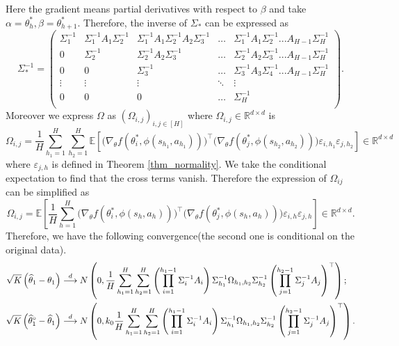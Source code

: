 \documentclass{article}
\numberwithin{equation}{section}
\theoremstyle{plain}
\theoremstyle{definition}
\theoremstyle{remark}
\begin{document}
Here the gradient means partial derivatives with respect to $\beta$ and take $\alpha = \theta_h^*, \beta = \theta_{h+1}^*.$ Therefore, the inverse of $\Sigma_*$ can be expressed as
\begin{equation*}
    \Sigma^{-1}_* = \begin{pmatrix}
    \Sigma^{-1}_1 & \Sigma^{-1}_1 A_1 \Sigma^{-1}_2 & \Sigma^{-1}_1 A_1 \Sigma^{-1}_2 A_2 \Sigma^{-1}_3 & \ldots & \Sigma^{-1}_1 A_1 \Sigma^{-1}_2 ... A_{H-1}\Sigma^{-1}_H \\
    0 & \Sigma^{-1}_2 & \Sigma^{-1}_2 A_2 \Sigma^{-1}_3 & \ldots & \Sigma^{-1}_2 A_2 \Sigma^{-1}_3 ... A_{H-1} \Sigma^{-1}_H \\
    0 & 0 & \Sigma^{-1}_3 & \ldots & \Sigma^{-1}_3 A_3 \Sigma^{-1}_4 ... A_{H-1} \Sigma^{-1}_H \\
    \vdots & \vdots & \vdots & \ddots & \vdots \\
    0 & 0 & 0 & \ldots & \Sigma^{-1}_H \\
    \end{pmatrix}.
\end{equation*}
Moreover we express $\Omega$ as $(\Omega_{i,j})_{i,j \in [H]}$ where $\Omega_{i,j} \in \mathbb{R}^{d \times d}$ is
\begin{equation*}
    \Omega_{i,j}=\frac{1}{H} \sum_{h_{1}=1}^{H} \sum_{h_{2}=1}^{H} \mathbb{E}\left[\bigg(\nabla_{\theta} f\left(\theta_{i}^*, \phi(s_{h_{1}}, a_{h_{1}})\right)\bigg)^{\top}\bigg(\nabla_{\theta} f\left(\theta_{j}^*, \phi(s_{h_{2}}, a_{h_{2}})\right)\bigg) \varepsilon_{i,h_1} \varepsilon_{j,h_2}\right] \in \mathbb{R}^{d \times d}
\end{equation*}
where $\varepsilon_{j,h}$ is defined in Theorem \ref{thm_normality}. We take the conditional expectation to find that the cross terms vanish. Therefore the expression of $\Omega_{ij}$ can be simplified as
\begin{equation}
    \Omega_{i,j} = \mathbb{E} \left[\frac{1}{H} \sum_{h = 1}^H  \bigg(\nabla_{\theta} f \left(\theta_i^*,\phi(s_{h},a_{h})\right) \bigg)^{\top} \bigg(\nabla_{\theta} f \left(\theta_j^*,\phi(s_{h},a_{h})\right) \bigg) \varepsilon_{i,h} \varepsilon_{j,h}\right] \in \mathbb{R}^{d \times d}.
\end{equation} 
Therefore, we have the following convergence(the second one is conditional on the original data).
\begin{align}\label{convergence_theta}
    \sqrt{K}\left(\widehat{\theta}_1 - \theta_1\right) & \stackrel{d}{\longrightarrow} N\left(0,\frac{1}{H} \sum_{h_1=1}^H \sum_{h_2 = 1}^H \left(\prod_{i=1}^{h_1-1} \Sigma_i^{-1} A_i \right)\Sigma^{-1}_{h_1} \Omega_{h_1,h_2} \Sigma^{-1}_{h_2} \left(\prod_{j=1}^{h_2-1} \Sigma_j^{-1} A_j \right)^{\top} \right); \notag \\
    \sqrt{K}\left(\widehat{\theta}_1^{\circ} - \widehat{\theta}_1\right) & \stackrel{d}{\longrightarrow} N\left(0,k_0 \frac{1}{H} \sum_{h_1=1}^H \sum_{h_2 = 1}^H \left(\prod_{i=1}^{h_1-1} \Sigma_i^{-1} A_i \right)\Sigma^{-1}_{h_1} \Omega_{h_1,h_2} \Sigma^{-1}_{h_2} \left(\prod_{j=1}^{h_2-1} \Sigma_j^{-1} A_j \right)^{\top} \right).
\end{align}
\end{document}

